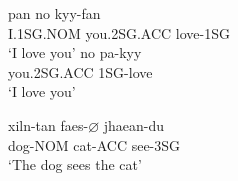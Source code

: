\documentclass[main.tex]{subfiles}
\begin{document}
\begin{exe}
    \ex
        \gll pan no kyy-fan\\
        I.1SG.NOM you.2SG.ACC love-1SG\\
        \trans `I love you'
    \ex
        \gll no pa-kyy\\
        you.2SG.ACC 1SG-love\\
        \trans `I love you'

    \ex \gll xiln-tan faes-$\varnothing$ jhaean-du\\
        dog-NOM cat-ACC see-3SG\\
        \trans `The dog sees the cat'
\end{exe}
\end{document}
